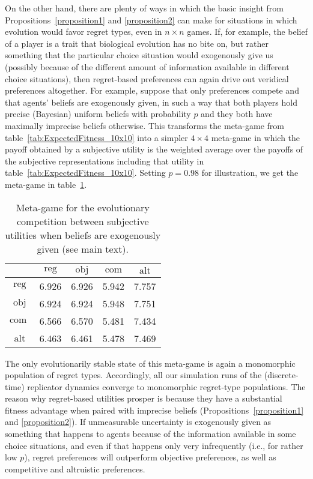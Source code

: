 \documentclass[fleqn,reqno,12pt]{article}
\theoremstyle{Satz}
\theoremstyle{Bsp}
\begin{document}
On the other hand, there are plenty of ways in which the basic insight from
Propositions~\ref{proposition1} and \ref{proposition2} can make for situations in which
evolution would favor regret types, even in $n \times n$ games. If, for example, the belief of
a player is a trait that biological evolution has no bite on, but rather something that the
particular choice situation would exogenously give us (possibly because of the different amount
of information available in different choice situations), then regret-based preferences can
again drive out veridical preferences altogether. For example, suppose that only preferences
compete and that agents' beliefs are exogenously given, in such a way that both players hold
precise (Bayesian) uniform beliefs with probability $p$ and they both have maximally imprecise
beliefs otherwise. This transforms the meta-game from table~\ref{tab:ExpectedFitness_10x10}
into a simpler $4 \times 4$ meta-game in which the payoff obtained by a subjective utility is
the weighted average over the payoffs of the subjective representations including that utility
in table~\ref{tab:ExpectedFitness_10x10}. Setting $p = 0.98$ for illustration, we get the
meta-game in table~\ref{tab:ExogeneousEpistemics}.
\begin{table}[]
\centering
\begin{tabular}{ccccc}
  \toprule
  & $\text{reg}$ 
  & $\text{obj}$
  & $\text{com}$
  & $\text{alt}$ \\ 
  \midrule
  $\text{reg} $ & 6.926 & 6.926 & 5.942 & 7.757 \\ 
  $\text{obj} $ & 6.924 & 6.924 & 5.948 & 7.751 \\ 
  $\text{com }$ & 6.566 & 6.570 & 5.481 & 7.434 \\ 
  $\text{alt} $ & 6.463 & 6.461 & 5.478 & 7.469 \\ 
   \bottomrule
\end{tabular}
\caption{Meta-game for the evolutionary competition between subjective utilities when beliefs are exogenously
  given (see main text).}
\label{tab:ExogeneousEpistemics}
\end{table}
The only evolutionarily stable state of this meta-game is again a monomorphic population of regret types. Accordingly, all
our simulation runs of the (discrete-time) replicator dynamics converge to monomorphic
regret-type populations. The reason why regret-based utilities prosper is because they have a substantial
fitness advantage when paired with imprecise beliefs (Propositions~\ref{proposition1} and \ref{proposition2}). If unmeasurable uncertainty is exogenously given
as something that happens to agents because of the information available in some choice situations, and even if that happens only very infrequently
(i.e., for rather low $p$), regret preferences will outperform objective preferences, as
well as competitive and altruistic preferences.
\end{document}

